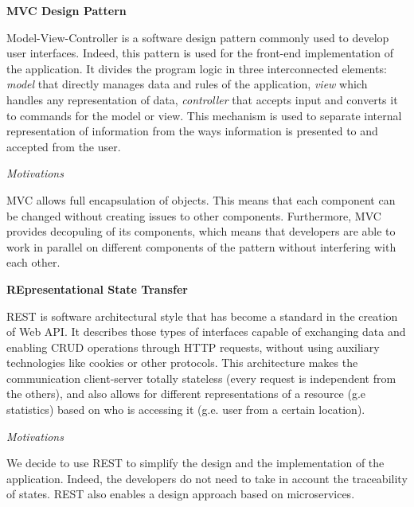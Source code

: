 \documentclass{report}
\begin{document}
\begin{center}\large{\textbf{MVC Design Pattern}}\end{center}
Model-View-Controller is a software design pattern commonly used to develop user interfaces. Indeed, this pattern is used for the front-end implementation of the application. It divides the program logic in three interconnected elements: \textit{model} that directly manages data and rules of the application, \textit{view} which handles any representation of data, \textit{controller} that 
accepts input and converts it to commands for the model or view. This mechanism is used to separate internal representation of information from the ways information is presented to and accepted from the user. 
\begin{center}\large{\textit{Motivations}}\end{center} 
MVC allows full encapsulation of objects. This means that each component can be changed without creating issues to other components.
Furthermore, MVC provides decopuling of its components, which means that developers are able to work in parallel on different components of the pattern without interfering with each other.

\vspace{2mm}
\begin{center}\large{\textbf{REpresentational State Transfer}}\end{center}
REST is software architectural style that has become a standard in the creation of Web API. It describes those types of interfaces capable of exchanging data and enabling CRUD operations through HTTP requests, without using auxiliary technologies like cookies or other protocols. This architecture makes the communication client-server totally stateless (every request is independent from the others), and also allows for different representations of a resource (g.e statistics) based on who is accessing it (g.e. user from a certain location).
\begin{center}\large{\textit{Motivations}}\end{center}
We decide to use REST to simplify the design and the implementation of the application. Indeed, the developers do not need to take in account the traceability of states. REST also enables a design approach based on microservices.
\end{document}
